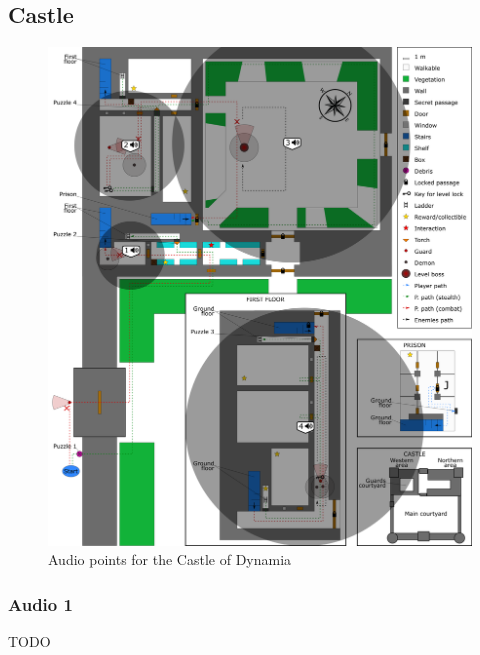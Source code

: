 \subsection{Castle}
\begin{figure}[H]
  \centering
  \includegraphics[width=\textwidth]{Images/Maps/castleOfDynamiaAudio}
  \caption{Audio points for the Castle of Dynamia}
\end{figure}

\subsubsection*{Audio 1}
TODO
